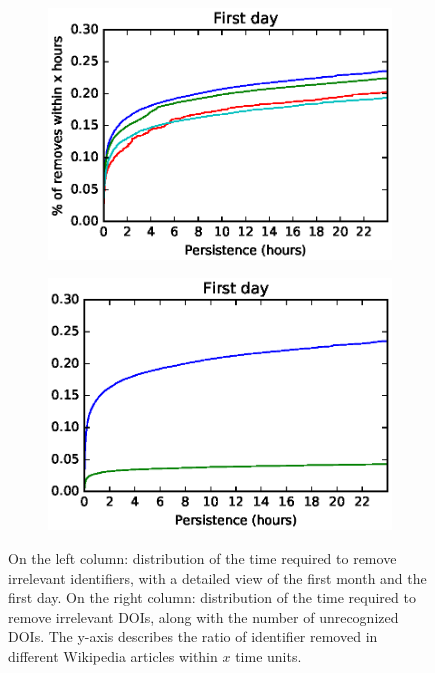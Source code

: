 \begin{figure}[h]
    \begin{subfigure}{.5\textwidth}
        \centering
        \includegraphics[keepaspectratio=true, width=1\linewidth]{assets/irrelevant_identifiers_persistence_cdf_1day}
\label{fig:irrelevant_identifiers_persistence_cdf_1day}
    \end{subfigure}%
    \begin{subfigure}{.5\textwidth}
        \centering
        \includegraphics[keepaspectratio=true, width=1\linewidth]{assets/irrelevant_doi_persistence_cdf_1day}
\label{fig:irrelevant_doi_persistence_cdf_1day}
    \end{subfigure}
    \caption{On the left column: distribution of the time required to remove irrelevant identifiers, with a detailed view of the first month and the first day.
    On the right column: distribution of the time required to remove irrelevant DOIs, along with the number of unrecognized DOIs.
    The y-axis describes the ratio of identifier removed in different Wikipedia articles within $x$ time units.}
\label{fig:irrelevant_identifiers_and_dois}
\end{figure}

